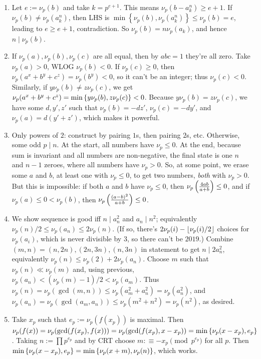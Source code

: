 \documentclass[11pt,paper=letter]{scrartcl}
\begin{document}
\begin{enumerate}
\item Let $ e := \nu_p(b) $ and take $k = p^{e + 1}$. This means $ \nu_p(b - a_k^n) \ge e + 1 $. If $ \nu_{p} (b) \ne \nu_p(a_k^n) $, then LHS is $\min \left\{ \nu_p(b), \nu_p(a_k^n) \right\} \le \nu_p(b) = e $, leading to $e \ge e + 1$, contradiction. So $\nu_p(b) = n \nu_p(a_k)$, and hence $n \mid \nu_p(b)$.

\item If $\nu_p(a), \nu_p(b), \nu_p(c)$ are all equal, then by $abc = 1$ they're all zero. Take $\nu_p(a) > 0$, WLOG $\nu_p(b) < 0$. If $\nu_p(c) \ge 0$, then $\nu_p(a^x + b^y + c^z) = \nu_p(b^y) < 0$, so it can't be an integer; thus $\nu_p(c) < 0$. Similarly, if $y \nu_p(b) \ne z \nu_p(c)$, we get $\nu_p(a^x + b^y + c^z) = \min\left\{  y\nu_p(b), z \nu_p(c)  \right\} < 0$. Because $y \nu_p(b) = z \nu_p(c)$, we have some $d, y', z'$ such that $\nu_p(b) = -dz'$, $\nu_p(c) = -dy'$, and $\nu_p(a) = d(y' + z')$, which makes it powerful.

\item Only powers of $2$: construct by pairing $1$s, then pairing $2$s, etc. Otherwise, some odd $p \mid n$. At the start, all numbers have $\nu_p \le 0$. At the end, because sum is invariant and all numbers are non-negative, the final state is one $n$ and $n-1$ zeroes, where all numbers have $\nu_p > 0$. So, at some point, we erase some $a$ and $b$, at least one with $\nu_p \le 0$, to get two numbers, \textit{both} with $\nu_p > 0$. But this is impossible: if both $a$ and $b$ have $\nu_p \le 0$, then $\nu_p\left( \frac{4ab}{a+b} \right) \le 0$, and if $\nu_p(a) \le 0 < \nu_p(b)$, then $\nu_p\left( \frac{(a - b)^2}{a + b} \right) \le 0$.

\item We show sequence is good iff $n \mid a_n^2$ and $a_n \mid n^2$; equivalently $\nu_p(n)/2 \le \nu_p(a_n) \le 2\nu_p(n)$. (If so, there's $2\nu_p(i) - \left\lfloor \nu_p(i)/2 \right\rfloor$ choices for $\nu_p(a_i)$, which is never divisible by $3$, so there can't be $2019$.) Combine $(m, n) = (n, 2n), (2n, 3n), (n, 3n)$ in statement to get $n \mid 2a_n^2$, equivalently $\nu_p(n) \le \nu_p(2) + 2\nu_p(a_n)$. Choose $m$ such that $\nu_p(n) \ll \nu_p(m)$ and, using previous, $\nu_p(a_n) < (\nu_p(m) - 1)/2 < \nu_p(a_m)$. Thus $\nu_p(n) = \nu_p(\gcd(m, n)) \le \nu_p(a_m^2 + a_n^2) = \nu_p(a_n^2)$, and $\nu_p(a_n) = \nu_p(\gcd(a_m, a_n)) \le \nu_p(m^2 + n^2) = \nu_p(n^2)$, as desired.

\item Take $x_p$ such that $e_p := \nu_p(f(x_p))$ is maximal. Then $\nu_p(f(x)) = \nu_p(\gcd(f(x_p), f(x))) = \nu_p(\gcd(f(x_p), x - x_p)) = \min\left\{ \nu_p(x - x_p), e_p \right\}$. Taking $n := \prod p^{e_p}$ and by CRT choose $m :\equiv -x_p \pmod{p^{e_p}}$ for all $p$. Then $\min\left\{ \nu_p(x - x_p), e_p \right\} = \min\left\{ \nu_p(x + m), \nu_p(n) \right\}$, which works.


\end{enumerate}
\end{document}
